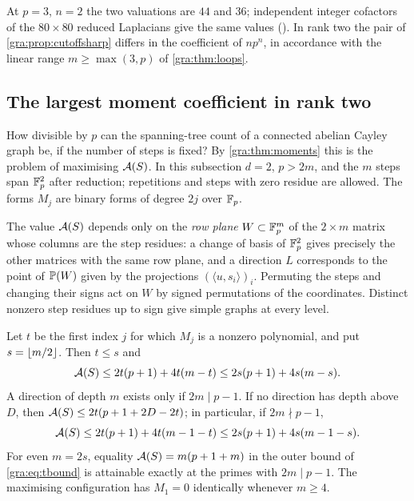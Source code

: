 At $p=3$, $n=2$ the two valuations are $44$ and $36$; independent integer
cofactors of the $80\times80$ reduced Laplacians give the same values
(). In rank two the
pair of \cref{gra:prop:cutoffsharp} differs in the coefficient of $np^n$,
in accordance with the linear range $m\ge\max(3,p)$ of
\cref{gra:thm:loops}.

\subsection{The largest moment coefficient in rank two}\label{gra:sec:extremal}
{\raggedright
{}
}

How divisible by $p$ can the spanning-tree count of a connected abelian
Cayley graph be, if the number of steps is fixed? By
\cref{gra:thm:moments} this is the problem of maximising $\mathcal{A}(S)$. In
this subsection $d=2$, $p>2m$, and the $m$ steps span $\mathbb{F}_p^2$ after
reduction; repetitions and steps with zero residue are allowed. The forms
$M_j$ are binary forms of degree $2j$ over $\mathbb{F}_p$.

The value $\mathcal{A}(S)$ depends only on the \emph{row plane}
$W\subset\mathbb{F}_p^m$ of the $2\times m$ matrix whose columns are the step
residues: a change of basis of $\mathbb{F}_p^2$ gives precisely the other matrices
with the same row plane, and a direction $L$ corresponds to the point of
$\mathbb{P}(W)$ given by the projections $(\langle u,s_i\rangle)_i$. Permuting
the steps and changing their signs act on $W$ by signed permutations of
the coordinates. Distinct nonzero step residues up to sign give simple
graphs at every level.

\begin{theorem}\label{gra:thm:extremal}
Let $t$ be the first index $j$ for which $M_j$ is a nonzero polynomial, and
put $s=\lfloor m/2\rfloor$. Then $t\le s$ and
\begin{equation}\label{gra:eq:tbound}
 \mathcal{A}(S)\le2t(p+1)+4t(m-t)\le2s(p+1)+4s(m-s).
\end{equation}
A direction of depth $m$ exists only if $2m\mid p-1$. If no direction has
depth above $D$, then $\mathcal{A}(S)\le2t(p+1+2D-2t)$; in particular, if
$2m\nmid p-1$,
\begin{equation}\label{gra:eq:tboundnc}
 \mathcal{A}(S)\le2t(p+1)+4t(m-1-t)\le2s(p+1)+4s(m-1-s).
\end{equation}
For even $m=2s$, equality $\mathcal{A}(S)=m(p+1+m)$ in the outer bound of
\eqref{gra:eq:tbound} is attainable exactly at the primes with
$2m\mid p-1$. The maximising configuration has $M_1=0$ identically
whenever $m\ge4$.
\end{theorem}

